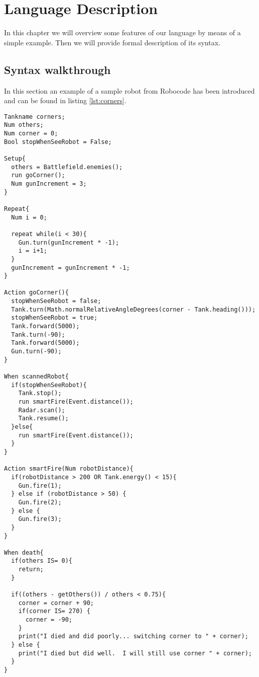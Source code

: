 \chapter{Language Description}
\label{chap:LanguageDescription}
In this chapter we will overview some features of our language by means of a simple example. Then we will provide formal description of its syntax. 

\section{Syntax walkthrough}
In this section an example of a sample robot from Robocode has been introduced and can be found in listing \ref{lst:corners}.

\begin{lstlisting}[caption={Eksampel of the sample robot "Corners" in our language}, label={lst:corners}]
Tankname corners;
Num others;
Num corner = 0;
Bool stopWhenSeeRobot = False;

Setup{
  others = Battlefield.enemies();  
  run goCorner();	 
  Num gunIncrement = 3;
}

Repeat{  
  Num i = 0;
  
  repeat while(i < 30){
    Gun.turn(gunIncrement * -1);
    i = i+1;
  }  
  gunIncrement = gunIncrement * -1;
}

Action goCorner(){
  stopWhenSeeRobot = false;  
  Tank.turn(Math.normalRelativeAngleDegrees(corner - Tank.heading()));      
  stopWhenSeeRobot = true;
  Tank.forward(5000);
  Tank.turn(-90);
  Tank.forward(5000);
  Gun.turn(-90);
}

When scannedRobot{
  if(stopWhenSeeRobot){
    Tank.stop();                                     
    run smartFire(Event.distance());
    Radar.scan();                                     
    Tank.resume();                                   
  }else{
    run smartFire(Event.distance());
  }
}

Action smartFire(Num robotDistance){
  if(robotDistance > 200 OR Tank.energy() < 15){
    Gun.fire(1);
  } else if (robotDistance > 50) {
    Gun.fire(2);
  } else {
    Gun.fire(3);
  }
}

When death{
  if(others IS= 0){
    return;
  }
  
  if((others - getOthers()) / others < 0.75){
    corner = corner + 90;
    if(corner IS= 270) {
      corner = -90;
    }
    print("I died and did poorly... switching corner to " + corner);
  } else {
    print("I died but did well.  I will still use corner " + corner);
  }
}
\end{lstlisting}

